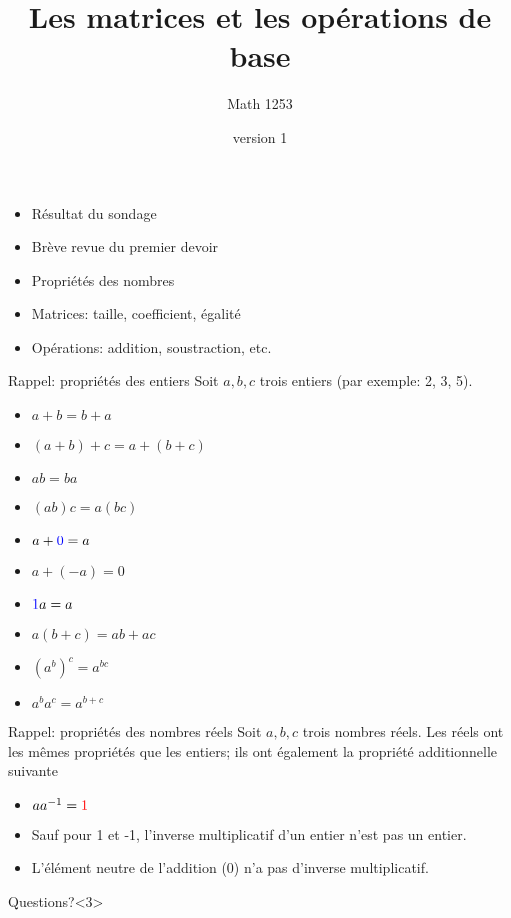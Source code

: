 \documentclass[french, handout]{beamer}
\title{Les matrices et les opérations de base}
\author{Math 1253} %
\date{version 1}   %
\begin{document}
	\frame{\titlepage}
	
\begin{frame}
\begin{itemize}
\item Résultat du sondage
\item Brève revue du premier devoir
\item Propriétés des nombres
\item Matrices: taille, coefficient, égalité
\item Opérations: addition, soustraction, etc.
\end{itemize}
\end{frame}
	
\begin{frame}{Rappel: propriétés des entiers}
Soit $a, b, c$ trois entiers (par exemple: 2, 3, 5).
\begin{itemize}[<+-|alert@+>]
\item $a+b = b+a$ \qquad {}
\item $(a+b) + c = a + (b+c)$ \qquad {}
\item $ab = ba$ \qquad {}
\item $(ab)c = a(bc)$ \qquad {}
\item $a + \textcolor{blue}{0} = a$ \qquad {}
\item $a + (-a) = 0$ 
\item $\textcolor{blue}{1}a = a$ \qquad {}
\item $a(b+c) = ab + ac$ \qquad {}
\item $\left(a^b\right)^c = a^{bc}$ \qquad {}
\item $a^b a^c = a^{b+c}$ \qquad {}
\end{itemize}

\end{frame}	

\begin{frame}{Rappel: propriétés des nombres réels}
Soit $a, b, c$ trois nombres réels. Les réels ont les mêmes propriétés que les entiers;
ils ont également la propriété additionnelle suivante
\begin{itemize}
\item $a a^{-1} = \textcolor{red}{1}$ 
\item<2-> Sauf pour 1 et -1, l'inverse multiplicatif d'un entier n'est pas un entier.
\item<2-> L'élément neutre de l'addition (0) n'a pas d'inverse multiplicatif.
\end{itemize}
\begin{block}{Questions?}<3>
\end{block}

\end{frame}
	
\end{document}
